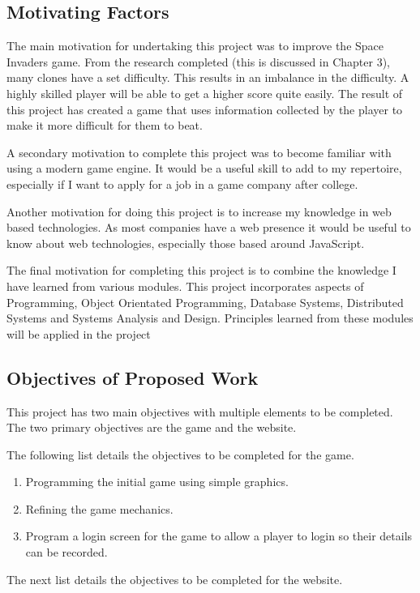 \documentclass[12pt]{article}
\begin{document}
{\centering \subsection{Motivating Factors}}
The main motivation for undertaking this project was to improve the Space Invaders game. From the research completed (this is discussed in Chapter 3), many clones have a set difficulty. This results in an imbalance in the difficulty. A highly skilled player will be able to get a higher score quite easily. The result of this project has created a game that uses information collected by the player to make it more difficult for them to beat. 

A secondary motivation to complete this project was to become familiar with using a modern game engine. It would be a useful skill to add to my repertoire, especially if I want to apply for a job in a game company after college. 

Another motivation for doing this project is to increase my knowledge in web based technologies. As most companies have a web presence it would be useful to know about web technologies, especially those based around JavaScript. 

The final motivation for completing this project is to combine the knowledge I have learned from various modules. This project incorporates aspects of Programming, Object Orientated Programming, Database Systems, Distributed Systems and Systems Analysis and Design. Principles learned from these modules will be applied in the project

{\centering \subsection{Objectives of Proposed Work}}
This project has two main objectives with multiple elements to be completed. The two primary objectives are the game and the website. 

The following list details the objectives to be completed for the game.

\begin{enumerate}
\item Programming the initial game using simple graphics.
\item Refining the game mechanics.
\item Program a login screen for the game to allow a player to login so their details can
be recorded.
\end{enumerate}

The next list details the objectives to be completed for the website.
\end{document}
